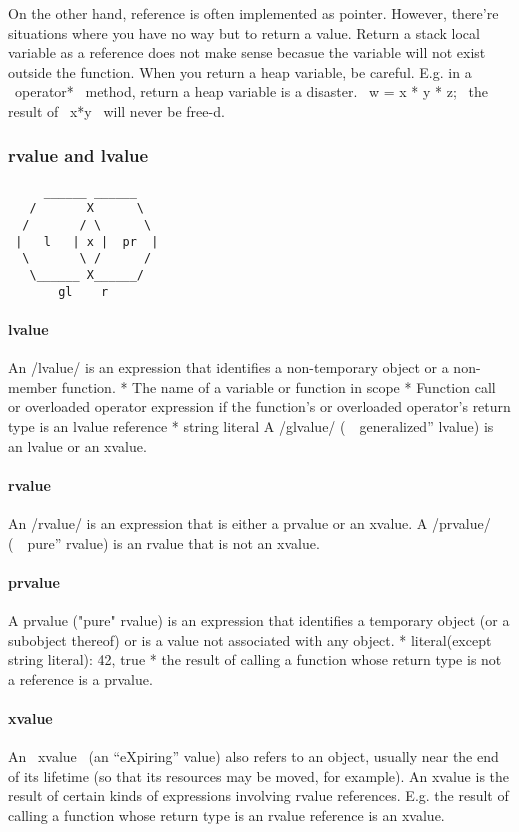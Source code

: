 On the other hand, reference is often implemented as pointer.
However, there're situations where you have no way but to return a
value.  Return a stack local variable as a reference does not make
sense becasue the variable will not exist outside the function.  When
you return a heap variable, be careful. E.g. in a ~operator*~ method,
return a heap variable is a disaster.  ~w = x * y * z;~ the result of
~x*y~ will never be free-d.
\subsubsection{rvalue and lvalue}
\begin{lstlisting}
     ______ ______
   /       X      \
  /       / \      \
 |   l   | x |  pr  |
  \       \ /      /
   \______ X______/
       gl    r
\end{lstlisting}
\paragraph{lvalue}
 An /lvalue/ is an expression that identifies a non-temporary object or a non-member function.
  * The name of a variable or function in scope
  * Function call or overloaded operator expression if the function's or overloaded operator's return type is an lvalue reference
  * string literal
 A /glvalue/ (~~generalized'' lvalue) is an lvalue or an xvalue.
\paragraph{rvalue}
 An /rvalue/ is an expression that is either a prvalue or an xvalue.
 A /prvalue/ (~~pure'' rvalue) is an rvalue that is not an xvalue.
\paragraph{prvalue}
 A prvalue ("pure" rvalue) is an expression that identifies a temporary object (or a subobject thereof)
 or is a value not associated with any object.
  * literal(except string literal): 42, true
  * the result of calling a function whose return type is not a reference is a prvalue.
\paragraph{xvalue}
 An ~xvalue~ (an “eXpiring” value) also refers to an object, usually near the end of its lifetime (so that its resources may be moved, for example).
 An xvalue is the result of certain kinds of expressions involving rvalue references.
 E.g. the result of calling a function whose return type is an rvalue reference is an xvalue.

